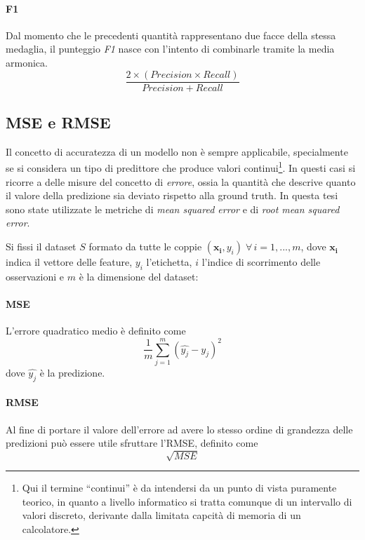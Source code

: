 \documentclass[12pt]{report}
\theoremstyle{definition}
\begin{document}
\paragraph{F1}
Dal momento che le precedenti quantità rappresentano due facce della stessa medaglia, il punteggio \textit{F1} nasce con l'intento di combinarle tramite la media armonica.
\begin{equation}
\frac{2 \times (Precision \times Recall)}{Precision + Recall}
\end{equation}

\subsection{MSE e RMSE}\label{erroreregr}
Il concetto di accuratezza di un modello non è sempre applicabile, specialmente se si considera un tipo di predittore che produce valori continui\footnote{Qui il termine ``continui'' è da intendersi da un punto di vista puramente teorico, in quanto a livello informatico si tratta comunque di un intervallo di valori discreto, derivante dalla limitata capcità di memoria di un calcolatore.}. In questi casi si ricorre a delle misure del concetto di \textit{errore}, ossia la quantità che descrive quanto il valore della predizione sia deviato rispetto alla ground truth.
In questa tesi sono state utilizzate le metriche di \textit{mean squared error} e di \textit{root mean squared error}.

Si fissi il dataset $S$ formato da tutte le coppie $(\mathbf{x_i},y_i) \; \forall\,i=1, ..., m$, dove $\mathbf{x_i}$ indica il vettore delle feature, $y_i$ l'etichetta, $i$ l'indice di scorrimento delle osservazioni e $m$ è la dimensione del dataset:
\paragraph{MSE} L'errore quadratico medio è definito come
\begin{equation}
    \frac{1}{m}\sum\limits_{j=1}^m (\hat{y_j} - y_j)^2
\end{equation}
dove $\hat{y_j}$ è la predizione.
\paragraph{RMSE}
Al fine di portare il valore dell'errore ad avere lo stesso ordine di grandezza delle predizioni può essere utile sfruttare l'RMSE, definito come 
\begin{equation}
    \sqrt{MSE}
\end{equation}
\end{document}
